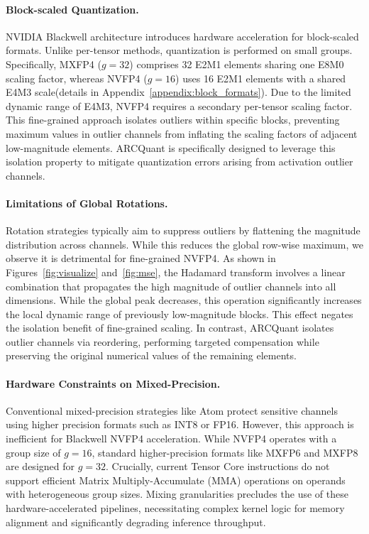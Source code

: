 \documentclass[11pt]{article}
\begin{document}
\paragraph{Block-scaled Quantization.} NVIDIA Blackwell architecture introduces hardware acceleration for block-scaled formats. Unlike per-tensor methods, quantization is performed on small groups. Specifically, MXFP4 ($g=32$) comprises 32 E2M1 elements sharing one E8M0 scaling factor, whereas NVFP4 ($g=16$) uses 16 E2M1 elements with a shared E4M3 scale(details in Appendix~\ref{appendix:block_formats}). Due to the limited dynamic range of E4M3, NVFP4 requires a secondary per-tensor scaling factor. This fine-grained approach isolates outliers within specific blocks, preventing maximum values in outlier channels from inflating the scaling factors of adjacent low-magnitude elements. ARCQuant is specifically designed to leverage this isolation property to mitigate quantization errors arising from activation outlier channels.




\paragraph{Limitations of Global Rotations.} Rotation strategies typically aim to suppress outliers by flattening the magnitude distribution across channels. While this reduces the global row-wise maximum, we observe it is detrimental for fine-grained NVFP4. As shown in Figures~\ref{fig:visualize} and~\ref{fig:mse}, the Hadamard transform involves a linear combination that propagates the high magnitude of outlier channels into all dimensions. While the global peak decreases, this operation significantly increases the local dynamic range of previously low-magnitude blocks. This effect negates the isolation benefit of fine-grained scaling. In contrast, ARCQuant isolates outlier channels via reordering, performing targeted compensation while preserving the original numerical values of the remaining elements.

\paragraph{Hardware Constraints on Mixed-Precision.} Conventional mixed-precision strategies like Atom protect sensitive channels using higher precision formats such as INT8 or FP16. However, this approach is inefficient for Blackwell NVFP4 acceleration. While NVFP4 operates with a group size of $g=16$, standard higher-precision formats like MXFP6 and MXFP8 are designed for $g=32$. Crucially, current Tensor Core instructions do not support efficient Matrix Multiply-Accumulate (MMA) operations on operands with heterogeneous group sizes. Mixing granularities precludes the use of these hardware-accelerated pipelines, necessitating complex kernel logic for memory alignment and significantly degrading inference throughput.
\end{document}
